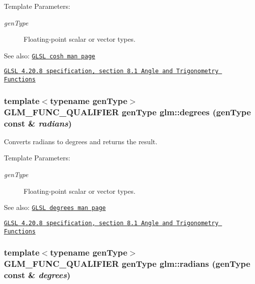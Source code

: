 \begin{Desc}
\item[Template Parameters:]
\begin{description}
\item[{\em genType}]Floating-point scalar or vector types.\end{description}
\end{Desc}
\begin{Desc}
\item[See also:]\href{http://www.opengl.org/sdk/docs/manglsl/xhtml/cosh.xml}{\tt GLSL cosh man page} 

\href{http://www.opengl.org/registry/doc/GLSLangSpec.4.20.8.pdf}{\tt GLSL 4.20.8 specification, section 8.1 Angle and Trigonometry Functions} \end{Desc}
\hypertarget{group__core__func__trigonometric_gcb63bdf23d5e084a5b6a2ed0ae395e64}{
\subsubsection[degrees]{\setlength{\rightskip}{0pt plus 5cm}template$<$typename genType$>$ GLM\_\-FUNC\_\-QUALIFIER genType glm::degrees (genType const \& {\em radians})}}
\label{group__core__func__trigonometric_gcb63bdf23d5e084a5b6a2ed0ae395e64}


Converts radians to degrees and returns the result.

\begin{Desc}
\item[Template Parameters:]
\begin{description}
\item[{\em genType}]Floating-point scalar or vector types.\end{description}
\end{Desc}
\begin{Desc}
\item[See also:]\href{http://www.opengl.org/sdk/docs/manglsl/xhtml/degrees.xml}{\tt GLSL degrees man page} 

\href{http://www.opengl.org/registry/doc/GLSLangSpec.4.20.8.pdf}{\tt GLSL 4.20.8 specification, section 8.1 Angle and Trigonometry Functions} \end{Desc}
\hypertarget{group__core__func__trigonometric_g87953103f3ac701b8440a7d904fa2e4d}{
\subsubsection[radians]{\setlength{\rightskip}{0pt plus 5cm}template$<$typename genType$>$ GLM\_\-FUNC\_\-QUALIFIER genType glm::radians (genType const \& {\em degrees})}}
\label{group__core__func__trigonometric_g87953103f3ac701b8440a7d904fa2e4d}


